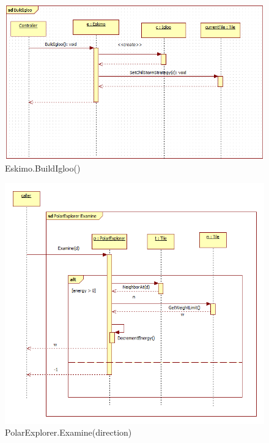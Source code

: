 \begin{figure}[H]
	\begin{center}
		\includegraphics[width=15cm]{chapters/chapter03/seqdiag/Eskimo_BuildIgloo.png}
		\caption{Eskimo.BuildIgloo()}
		\label{fig:EskimoBuildIgloo}
	\end{center}
\end{figure}
\begin{figure}[H]
	\begin{center}
		\includegraphics[width=15cm]{chapters/chapter03/seqdiag/PolarExplorer_Examine.png}
		\caption{PolarExplorer.Examine(direction)}
		\label{fig:PolarExplorerExamine}
	\end{center}
\end{figure}
